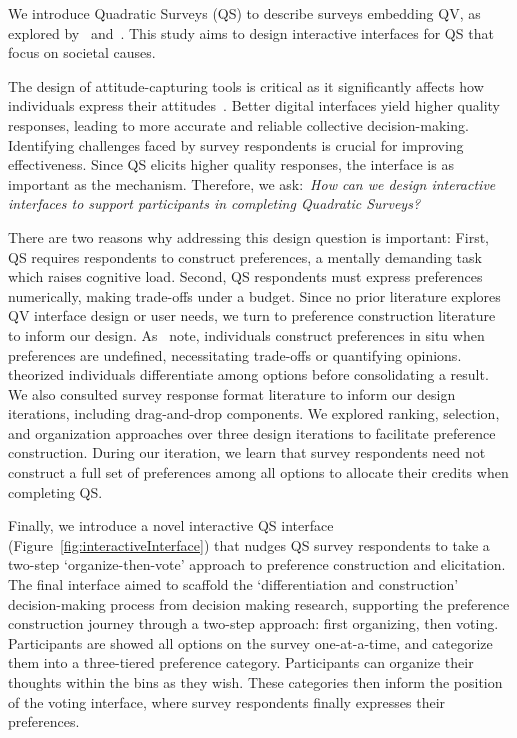 We introduce Quadratic Surveys (QS) to describe surveys embedding QV, as explored by~\textcite{quarfoot2017quadratic} and~\textcite{chengCanShowWhat2021}. This study aims to design interactive interfaces for QS that focus on societal causes. 

The design of attitude-capturing tools is critical as it significantly affects how individuals express their attitudes~\cite{engstrom2020politics, weijtersEffectRatingScale2010, kierujVariationsResponseStyle2010, toepoelSmileysStarsHearts2019, farzandAestheticsEvaluatingResponse2024, xiaoTellMeYourself2020, pielotDidYouMisclick2024}. Better digital interfaces yield higher quality responses, leading to more accurate and reliable collective decision-making. Identifying challenges faced by survey respondents is crucial for improving effectiveness. Since QS elicits higher quality responses, the interface is as important as the mechanism. Therefore, we ask:~\textit{How can we design interactive interfaces to support participants in completing Quadratic Surveys?}

There are two reasons why addressing this design question is important: First, QS requires respondents to construct preferences, a mentally demanding task which raises cognitive load. Second, QS respondents must express preferences numerically, making trade-offs under a budget. Since no prior literature explores QV interface design or user needs, we turn to preference construction literature to inform our design. As~\textcite{lichtensteinConstructionPreference2006} note, individuals construct preferences in situ when preferences are undefined, necessitating trade-offs or quantifying opinions. \textcite{svensonDifferentiationConsolidationTheory1992} theorized individuals differentiate among options before consolidating a result. We also consulted survey response format literature\cite{} to inform our design iterations, including drag-and-drop components. We explored ranking, selection, and organization approaches over three design iterations to facilitate preference construction. During our iteration, we learn that survey respondents need not construct a full set of preferences among all options to allocate their credits when completing QS.

Finally, we introduce a novel interactive QS interface (Figure~\ref{fig:interactiveInterface}) that nudges QS survey respondents to take a two-step `organize-then-vote' approach to preference construction and elicitation. The final interface aimed to scaffold the `differentiation and construction' decision-making process from decision making research, supporting the preference construction journey through a two-step approach: first organizing, then voting. Participants are showed all options on the survey one-at-a-time, and categorize them into a three-tiered preference category. Participants can organize their thoughts within the bins as they wish. These categories then inform the position of the voting interface, where survey respondents finally expresses their preferences.

